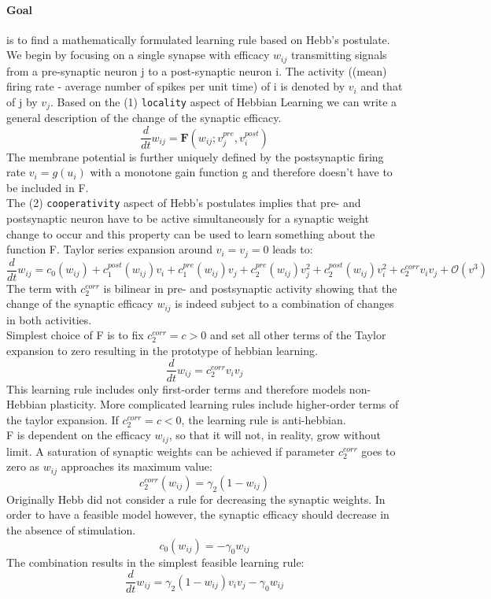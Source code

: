\documentclass[11pt]{article}
\begin{document}
\paragraph{Goal} is to find a mathematically formulated learning rule based on Hebb's postulate.\\
We begin by focusing on a single synapse with efficacy $w_{ij}$ transmitting signals from a pre-synaptic neuron j to a post-synaptic neuron i. The activity ((mean) firing rate - average number of spikes per unit time) of i is denoted by $v_i$ and that of j by $v_j$. Based on the (1) \texttt{locality} aspect of Hebbian Learning we can write a general description of the change of the synaptic efficacy. 
\[
\frac{d}{dt}w_{ij}=\mathbf{F}(w_{ij}; v_j^{pre}, v_i^{post})
\]
The membrane potential is further uniquely defined by the postsynaptic firing rate $v_i = g(u_i)$ with a monotone gain function g and therefore doesn't have to be included in F.\\
The (2) \texttt{cooperativity} aspect of Hebb's postulates implies that pre- and postsynaptic neuron have to be active simultaneously for a synaptic weight change to occur and this property can be used to learn something about the function F. Taylor series expansion around $v_i=v_j=0$ leads to:
\[
\frac{d}{dt}w_{ij}=c_0(w_{ij})+c_1^{post}(w_{ij})v_i+c_1^{pre}(w_{ij})v_j+c_2^{pre}(w_{ij})v_j^2+c_2^{post}(w_{ij})v_i^2+c_2^{corr}v_i v_j+\mathcal{O}(v^3)
\]
The term with $c_2^{corr}$ is bilinear in pre- and postsynaptic activity showing that the change of the synaptic efficacy $w_{ij}$ is indeed subject to a combination of changes in both activities.\\
Simplest choice of F is to fix $c_2^{corr}=c>0$ and set all other terms of the Taylor expansion to zero resulting in the prototype of hebbian learning.\\
\[
\frac{d}{dt}w_{ij}=c_2^{corr}v_i v_j
\]
This learning rule includes only first-order terms and therefore models non-Hebbian plasticity. More complicated learning rules include higher-order terms of the taylor expansion. If $c_2^{corr}=c<0$, the learning rule is anti-hebbian.\\
F is dependent on the efficacy $w_{ij}$, so that it will not, in reality, grow without limit. A saturation of synaptic weights can be achieved if parameter $c_2^{corr}$ goes to zero as $w_{ij}$ approaches its maximum value:
\[
	c_2^{corr}(w_{ij})=\gamma_2(1-w_{ij})
\]
Originally Hebb did not consider a rule for decreasing the synaptic weights. In order to have a feasible model however, the synaptic efficacy should decrease in the absence of stimulation.\\
\[
	c_0(w_{ij})=-\gamma_0 w_{ij}
\]
The combination results in the simplest feasible learning rule:
\[
\frac{d}{dt}w_{ij}=\gamma_2(1-w_{ij})v_i v_j-\gamma_0 w_{ij}
\]
\end{document}
